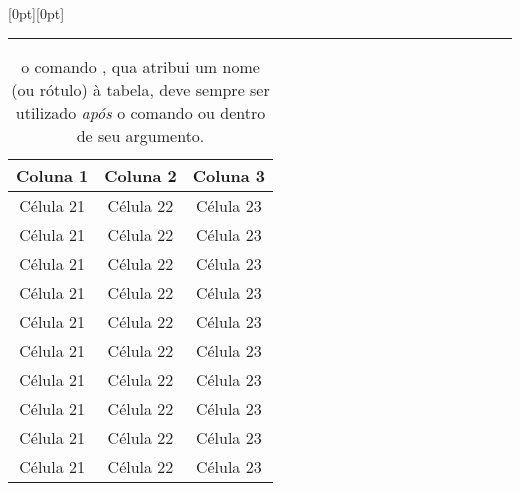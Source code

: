 \documentclass[a4paper,12pt]{article}
\renewcommand\topfraction{0.5}
\renewcommand\bottomfraction{0.5}
\begin{document}

	\lipsum[1]\lipsum[1]

	\begin{table}[htbp]
		\centering
		\raisebox{-\topfraction\textheight}[0pt][0pt]{\color{red}\rule{2pt}{\topfraction\textheight}}%
		\begin{tabular}[t]{ccc}
			\toprule
			Coluna 1  & Coluna 2  & Coluna 3  \\
			\midrule
			Célula 21 & Célula 22 & Célula 23 \\
			Célula 21 & Célula 22 & Célula 23 \\
			Célula 21 & Célula 22 & Célula 23 \\
			Célula 21 & Célula 22 & Célula 23 \\
			Célula 21 & Célula 22 & Célula 23 \\ 
			Célula 21 & Célula 22 & Célula 23 \\ 
			Célula 21 & Célula 22 & Célula 23 \\
			Célula 21 & Célula 22 & Célula 23 \\
			Célula 21 & Célula 22 & Célula 23 \\
			Célula 21 & Célula 22 & Célula 23 \\ 
			\bottomrule
		\end{tabular}
		
		\caption{o comando , qua atribui um nome (ou rótulo) à tabela, deve sempre ser utilizado \emph{após} o comando  ou dentro de seu argumento.}
		\label{tab:rotulo}
	\end{table}
	
	\lipsum[4-7]
	
\end{document}

